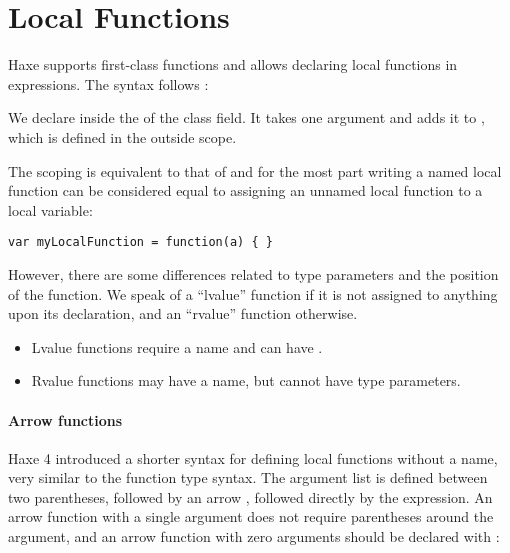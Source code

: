 

\section{Local Functions}
\label{expression-function}

Haxe supports first-class functions and allows declaring local functions in expressions. The syntax follows :


We declare  inside the  of the  class field. It takes one argument  and adds it to , which is defined in the outside scope.

The scoping is equivalent to that of  and for the most part writing a named local function can be considered equal to assigning an unnamed local function to a local variable:

\begin{lstlisting}
var myLocalFunction = function(a) { }
\end{lstlisting}

However, there are some differences related to type parameters and the position of the function. We speak of a ``lvalue'' function if it is not assigned to anything upon its declaration, and an ``rvalue'' function otherwise.

\begin{itemize}
	\item Lvalue functions require a name and can have .
	\item Rvalue functions may have a name, but cannot have type parameters.
\end{itemize}


\label{expression-arrow-function}
\paragraph{Arrow functions}

Haxe 4 introduced a shorter syntax for defining local functions without a name, very similar to the function type syntax. The argument list is defined between two parentheses, followed by an arrow \expr{->}, followed directly by the expression. An arrow function with a single argument does not require parentheses around the argument, and an arrow function with zero arguments should be declared with :

